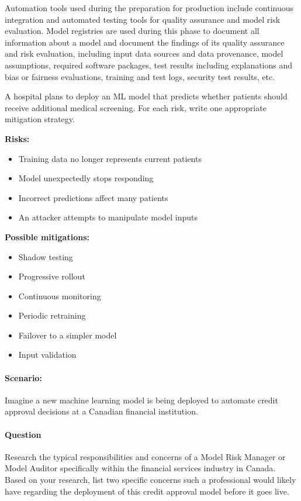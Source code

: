 Automation tools used during the preparation for production include continuous integration and automated testing tools for quality assurance and model risk evaluation. Model registries are used during this phase to document all information about a model and document the findings of its quality assurance and risk evaluation, including input data sources and data provenance, model assumptions, required software packages, test results including explanations and bias or fairness evaluations, training and test logs, security test results, etc. 


\begin{exerciseboxpaper}
A hospital plans to deploy an ML model that predicts whether
patients should receive additional medical screening. 
For each risk, write one appropriate mitigation strategy.

\bigskip
\begin{minipage}[t]{.55\textwidth}
{\bf Risks:}
\begin{itemize}
\item Training data no longer represents current patients
\item Model unexpectedly stops responding 
\item Incorrect predictions affect many patients
\item An attacker attempts to manipulate model inputs
\end{itemize}
\end{minipage}
\hfill
\begin{minipage}[t]{.4\textwidth}
{\bf Possible mitigations:}
\begin{itemize}
    \item Shadow testing
    \item Progressive rollout
    \item Continuous monitoring
    \item Periodic retraining
    \item Failover to a simpler model
    \item Input validation
\end{itemize}
\end{minipage}
\end{exerciseboxpaper}


\begin{exerciseboxpaper}
\paragraph*{Scenario:}
Imagine a new machine learning model is being deployed to automate credit approval decisions at a Canadian financial institution.

\paragraph*{Question}
Research the typical responsibilities and concerns of a Model Risk Manager or Model Auditor specifically within the financial services industry in Canada. Based on your research, list two specific concerns such a professional would likely have regarding the deployment of this credit approval model before it goes live.
\end{exerciseboxpaper}

